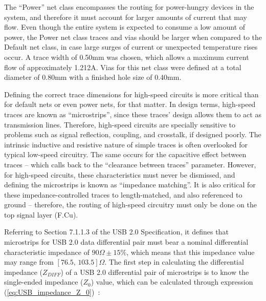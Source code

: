 The ``Power'' net class encompasses the routing for power-hungry devices in the system, and therefore it must account for larger amounts of current that may flow. Even though the entire system is expected to consume a low amount of power, the Power net class traces and vias should be larger when compared to the Default net class, in case large surges of current or unexpected temperature rises occur. A trace width of 0.50mm was chosen, which allows a maximum current flow of approximately 1.212A. Vias for this net class were defined at a total diameter of 0.80mm with a finished hole size of 0.40mm.

Defining the correct trace dimensions for high-speed circuits is more critical than for default nets or even power nets, for that matter. In design terms, high-speed traces are known as ``microstrips'', since these traces' design allows them to act as transmission lines. Therefore, high-speed circuits are specially sensitive to problems such as signal reflection, coupling, and crosstalk, if designed poorly. The intrinsic inductive and resistive nature of simple traces is often overlooked for typical low-speed circuitry. The same occurs for the capacitive effect between traces -- which calls back to the ``clearance between traces'' parameter. However, for high-speed circuits, these characteristics must never be dismissed, and defining the microstrips is known as ``impedance matching''. It is also critical for these impedance-controlled traces to length-matched, and also referenced to ground -- therefore, the routing of high-speed circuitry must only be done on the top signal layer (F.Cu).

Referring to Section 7.1.1.3 of the USB 2.0 Specification, it defines that microstrips for USB 2.0 data differential pair must bear a nominal differential characteristic impedance of $90 \Omega \pm 15\%$, which means that this impedance value may range from $[76.5,\, 103.5]\Omega$.
The first step in calculating the differential impedance ($Z_{DIFF}$) of a USB 2.0 differential pair of microstrips is to know the single-ended impedance ($Z_0$) value, which can be calculated through expression (\ref{eq:USB_impedance_Z_0})~\cite{USB_Routing}:

